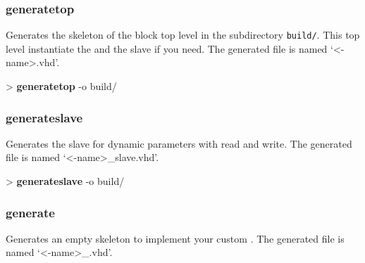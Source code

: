 \documentclass[10pt,a4paper]{article}
\begin{document}
\subsubsection{generatetop}

Generates the skeleton of the block top level in the subdirectory \texttt{build/}. This top level instantiate the \kind{} and the slave if you need. The generated file is named `<\kind{}-name>.vhd'.\\


\begin{sampletitle}
> \textbf{\tool{} generatetop} -o build/
\end{sampletitle}

\subsubsection{generateslave}

Generates the slave for dynamic parameters with read and write. The generated file is named `<\kind{}-name>\_slave.vhd'.\\


\begin{sampletitle}
> \textbf{\tool{} generateslave} -o build/
\end{sampletitle}

\subsubsection{generate\kind{}}

Generates an empty skeleton to implement your custom \kind{}. The generated file is named `<\kind{}-name>\_\kind{}.vhd'.\\

\end{document}
